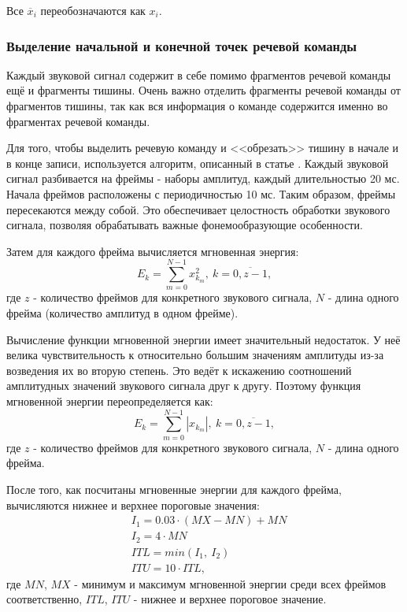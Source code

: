 Все $\overline{x}_i$ переобозначаются как $x_i$.

\subsubsection{Выделение начальной и конечной точек речевой команды}
Каждый звуковой сигнал содержит в себе помимо фрагментов речевой команды ещё и фрагменты тишины. Очень важно отделить фрагменты речевой команды от фрагментов тишины, так как вся информация о команде содержится именно во фрагментах речевой команды.

Для того, чтобы выделить речевую команду и <<обрезать>> тишину в начале и в конце записи, используется алгоритм, описанный в статье \cite{SignalPreprocessing}. 
Каждый звуковой сигнал разбивается на фреймы - наборы амплитуд, каждый длительностью 20 мс. Начала фреймов расположены с периодичностью 10 мс. Таким образом, фреймы пересекаются между собой. Это обеспечивает целостность обработки звукового сигнала, позволяя обрабатывать важные фонемообразующие особенности.

Затем для каждого фрейма вычисляется мгновенная энергия:
\begin{equation}
E_k = \sum_{m=0}^{N-1} x_{k_m}^2,~k=\overline{0,z-1},
\end{equation}
где $z$ - количество фреймов для конкретного звукового сигнала, $N$ - длина одного фрейма (количество амплитуд в одном фрейме).

Вычисление функции мгновенной энергии имеет значительный недостаток. У неё велика чувствительность к относительно большим значениям амплитуды из-за возведения их во вторую степень. Это ведёт к искажению соотношений амплитудных значений звукового сигнала друг к другу. Поэтому функция мгновенной энергии переопределяется как:
\begin{equation}
\label{eq:instant_energy}
E_k = \sum_{m=0}^{N-1} |x_{k_m}|,~k=\overline{0,z-1},
\end{equation}
где $z$ - количество фреймов для конкретного звукового сигнала, $N$ - длина одного фрейма.

После того, как посчитаны мгновенные энергии для каждого фрейма, вычисляются нижнее и верхнее пороговые значения:
\begin{equation}
\begin{aligned}
& I_1 = 0.03 \cdot (MX - MN) + MN \\
& I_2 = 4 \cdot MN \\
& ITL = min(I_1,~I_2)\\
& ITU = 10 \cdot ITL,
\end{aligned}
\end{equation}
где $MN$, $MX$ - минимум и максимум мгновенной энергии среди всех фреймов соответственно, $ITL$, $ITU$ - нижнее и верхнее пороговое значение.

